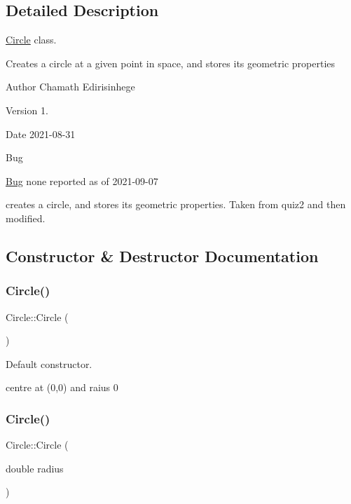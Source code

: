 \subsection{Detailed Description}
\hyperlink{classCircle}{Circle} class. 

Creates a circle at a given point in space, and stores its geometric properties \begin{DoxyAuthor}{Author}
Chamath Edirisinhege 
\end{DoxyAuthor}
\begin{DoxyVersion}{Version}
1. 
\end{DoxyVersion}
\begin{DoxyDate}{Date}
2021-\/08-\/31 
\end{DoxyDate}
\begin{DoxyRefDesc}{Bug}
\item[\hyperlink{bug__bug000002}{Bug}]none reported as of 2021-\/09-\/07 \end{DoxyRefDesc}


creates a circle, and stores its geometric properties. Taken from quiz2 and then modified. 

\subsection{Constructor \& Destructor Documentation}
\mbox{\label{classCircle_ad1ecfcfc7bf34529c6a6d6c448bf70fe}} 
\subsubsection{\texorpdfstring{Circle()}{Circle()}\hspace{0.1cm}{\footnotesize\ttfamily [1/3]}}
{\footnotesize\ttfamily Circle\+::\+Circle (\begin{DoxyParamCaption}{ }\end{DoxyParamCaption})}



Default constructor. 

centre at (0,0) and raius 0 \mbox{\label{classCircle_a05c707753451188c26b43508b610ff8e}} 
\subsubsection{\texorpdfstring{Circle()}{Circle()}\hspace{0.1cm}{\footnotesize\ttfamily [2/3]}}
{\footnotesize\ttfamily Circle\+::\+Circle (\begin{DoxyParamCaption}\item[{double}]{radius }\end{DoxyParamCaption})}



